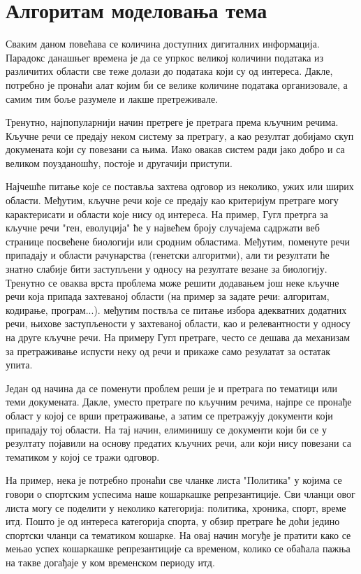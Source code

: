 \chapter{Алгоритам моделовања тема}

Сваким даном повећава се количина доступних дигиталних информација. Парадокс данашњег времена је да се упркос великој количини података из различитих области све теже долази до  података који су од интереса. Дакле, потребно је пронаћи алат којим би се велике количине података организовале, а самим тим боље разумеле и лакше претреживале.

Тренутно, најпопуларнији начин претреге је претрага према кључним речима. Кључне речи се предају неком систему за претрагу, а као резултат добијамо скуп докумената који су повезани са њима. Иако овакав систем ради јако добро и са великом поузданошћу, постоје и другачији приступи. %

Најчешће питање које се поставља захтева одговор из неколико, ужих или ширих области. Међутим, кључне речи које се предају као критеријум претраге могу карактерисати и области које нису од интереса. На пример, Гугл претрга за кључне речи "ген, еволуција" ће у највећем броју случајема садржати веб странице посвећене биологији или сродним областима. Међутим, поменуте речи припадају и области рачунарства (генетски алгоритми), али ти резултати ће знатно слабије бити заступљени у односу на резултате везане за биологију. Тренутно се оваква врста проблема може решити додавањем још неке кључне речи која припада захтеваној области (на пример за задате речи: алгоритам, кодирање, програм...). међутим поствља се питање избора адекватних додатних речи, њихове заступљености у захтеваној области, као и релевантности у односу на друге кључне речи. На примеру Гугл претраге, често се дешава да механизам за претраживање испусти неку од речи и прикаже само резулатат за остатак упита.

Један од начина да се поменути проблем реши је и  претрага по тематици или теми докумената. Дакле, уместо претраге по кључним речима, најпре се пронађе област у којој се врши претраживање, а затим се  претражују документи који припадају тој области. На тај начин, елиминишу се документи који би се у резултату појавили на основу предатих кључних речи, али који нису повезани са  тематиком у којој се тражи одговор. 

На пример, нека је потребно пронаћи све чланке листа "Политика" у којима се говори о спортским успесима наше кошаркашке репрезантиције. Сви чланци овог листа могу се поделити у неколико категорија: политика, хроника, спорт, време итд. Пошто је од интереса категорија спорта, у обзир претраге ће доћи једино спортски чланци са тематиком кошарке. На овај начин могуђе је пратити  како се мењао успех  кошаркашке репрезантиције са временом, колико се обаћала пажња на такве догађаје у ком временском периоду итд.

